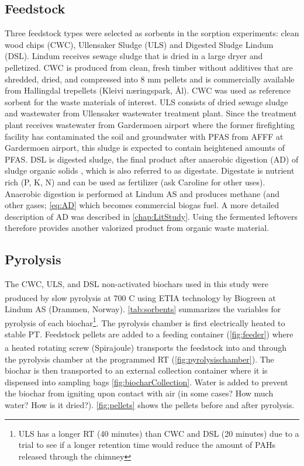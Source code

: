 \subsection{Feedstock}
Three feedstock types were selected as sorbents in the sorption experiments: clean wood chips (CWC), Ullensaker Sludge (ULS) and Digested Sludge Lindum (DSL). Lindum receives sewage sludge that is dried in a large dryer and pelletized. CWC is produced from clean, fresh timber without additives that are shredded, dried, and compressed into 8 mm pellets and is commercially available from Hallingdal trepellets (Kleivi næringspark, Ål). CWC was used as reference sorbent for the waste materials of interest. ULS consists of dried sewage sludge and wastewater from Ullensaker wastewater treatment plant. Since the treatment plant receives wastewater from Gardermoen airport where the former firefighting facility has contaminated the soil and groundwater with PFAS from AFFF at Gardermoen airport, this sludge is expected to contain heightened amounts of PFAS. DSL is digested sludge, the final product after anaerobic digestion (AD) of sludge organic solids \citep{Alhashimi2017}, which is also referred to as digestate. Digestate is nutrient rich (P, K, N) and can be used as fertilizer (ask Caroline for other uses). Anaerobic digestion is performed at Lindum AS and produces methane (and other gases; \cref{eq:AD} which becomes commercial biogas fuel. A more detailed description of AD was described in \cref{chap:LitStudy}. Using the fermented leftovers therefore provides another valorized product from organic waste material. 

\subsection{Pyrolysis}
The CWC, ULS, and DSL non-activated biochars used in this study were produced by slow pyrolysis at 700 \textdegree C using ETIA technology by Biogreen\textsuperscript{\textcopyright} at Lindum AS (Drammen, Norway). \cref{tab:sorbents} summarizes the variables for pyrolysis of each biochar\footnote{ULS has a longer RT (40 minutes) than CWC and DSL (20 minutes) due to a trial to see if a longer retention time would reduce the amount of PAHs released through the chimney}. The pyrolysis chamber is first electrically heated to stable PT. Feedstock pellets are added to a feeding container (\cref{fig:feeder}) where a heated rotating screw (Spirajoule\textsuperscript{\textregistered}) transports the feedstock into and through the pyrolysis chamber at the programmed RT (\cref{fig:pyrolysischamber}). The biochar is then transported to an external collection container where it is dispensed into sampling bags \cref{fig:biocharCollection}. Water is added to prevent the biochar from igniting upon contact with air (in some cases? How much water? How is it dried?). \cref{fig:pellets} shows the pellets before and after pyrolysis. 

